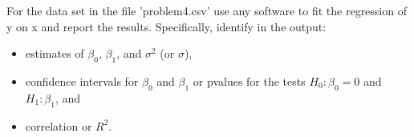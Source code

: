 \item For the data set in the file 'problem4.csv' use any software to fit the 
regression of y on x and report the results. Specifically, identify in the 
output:
\begin{itemize}
\item estimates of $\beta_0$, $\beta_1$, and $\sigma^2$ (or $\sigma$),
\item confidence intervals for $\beta_0$ and $\beta_1$ or pvalues for the tests
$H_0: \beta_0=0$ and $H_1: \beta_1$, and
\item correlation or $R^2$. 
\end{itemize} 



% 
% 
% 
% 
% 
% 
% 
